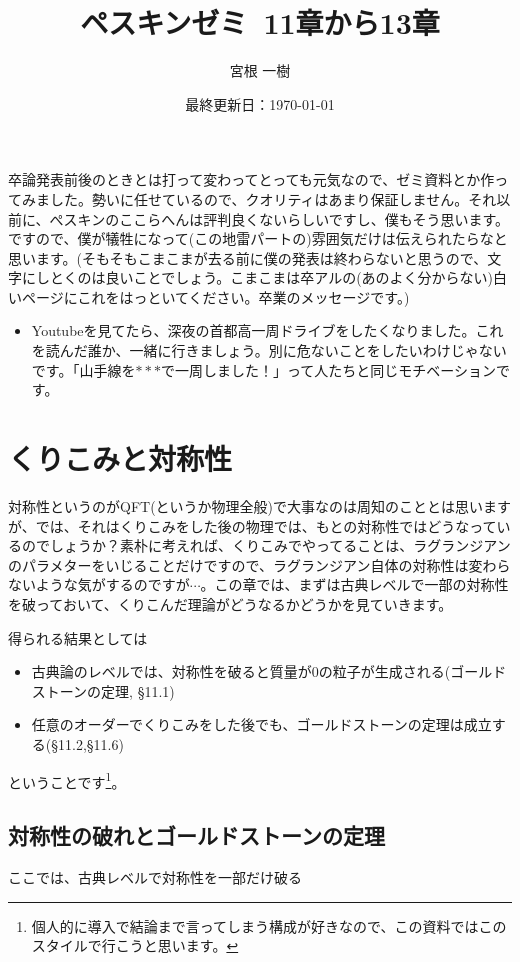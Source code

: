 \documentclass[unicode,a4paper,11pt]{ltjsarticle}
\title{ペスキンゼミ\ 11章から13章}
\author{宮根 一樹}
\date{最終更新日：\today}
\theoremstyle{definition}
\begin{document}
\maketitle

\tableofcontents

\vspace*{10pt}

卒論発表前後のときとは打って変わってとっても元気なので、ゼミ資料とか作ってみました。勢いに任せているので、クオリティはあまり保証しません。それ以前に、ぺスキンのここらへんは評判良くないらしいですし、僕もそう思います。ですので、僕が犠牲になって(この地雷パートの)雰囲気だけは伝えられたらなと思います。(そもそもこまこまが去る前に僕の発表は終わらないと思うので、文字にしとくのは良いことでしょう。こまこまは卒アルの(あのよく分からない)白いページにこれをはっといてください。卒業のメッセージです。)

\vspace*{10pt}

\begin{itemize}
   \item
         Youtubeを見てたら、深夜の首都高一周ドライブをしたくなりました。これを読んだ誰か、一緒に行きましょう。別に危ないことをしたいわけじゃないです。「山手線を$\ast\ast\ast$で一周しました！」って人たちと同じモチベーションです。
\end{itemize}

\clearpage

\section{くりこみと対称性}

対称性というのがQFT(というか物理全般)で大事なのは周知のこととは思いますが、では、それはくりこみをした後の物理では、もとの対称性ではどうなっているのでしょうか？素朴に考えれば、くりこみでやってることは、ラグランジアンのパラメターをいじることだけですので、ラグランジアン自体の対称性は変わらないような気がするのですが$\cdots$。この章では、まずは古典レベルで一部の対称性を破っておいて、くりこんだ理論がどうなるかどうかを見ていきます。

得られる結果としては
\begin{itemize}
   \item
         古典論のレベルでは、対称性を破ると質量が0の粒子が生成される(ゴールドストーンの定理, \S11.1)
   \item
         任意のオーダーでくりこみをした後でも、ゴールドストーンの定理は成立する(\S11.2,\S11.6)
\end{itemize}
ということです\footnote{
   個人的に導入で結論まで言ってしまう構成が好きなので、この資料ではこのスタイルで行こうと思います。
}。

\subsection{対称性の破れとゴールドストーンの定理}

ここでは、古典レベルで対称性を一部だけ破る
\end{document}

